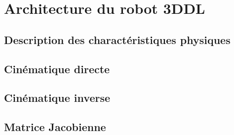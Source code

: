 \chapter{Architecture du robot 3DDL}     %

\section{Description des charactéristiques physiques}
\section{Cinématique directe}
\section{Cinématique inverse}
\section{Matrice Jacobienne}
